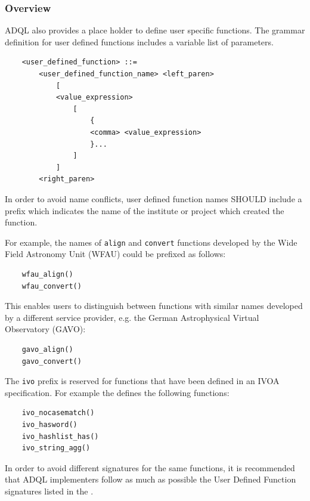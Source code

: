 \documentclass[11pt,a4paper]{ivoa}
\begin{document}
\subsubsection{Overview}

ADQL also provides a place holder to define user specific functions. The grammar
definition for user defined functions includes a variable list of parameters.

\begin{verbatim}
    <user_defined_function> ::=
        <user_defined_function_name> <left_paren>
            [
            <value_expression>
                [
                    {
                    <comma> <value_expression>
                    }...
                ]
            ]
        <right_paren>
\end{verbatim}

In order to avoid name conflicts, user defined function names SHOULD include
a prefix which indicates the name of the institute or project which created
the function.

For example, the names of \verb:align: and \verb:convert: functions developed
by the Wide Field Astronomy Unit (WFAU) could be prefixed as follows:
\begin{verbatim}
    wfau_align()
    wfau_convert()
\end{verbatim}

This enables users to distinguish between functions with similar names developed
by a different service provider, e.g. the German Astrophysical Virtual
Observatory (GAVO):
\begin{verbatim}
    gavo_align()
    gavo_convert()
\end{verbatim}

The \verb:ivo: prefix is reserved for functions that have been defined
in an IVOA specification. For example the \RegTAPSpec{} defines the following
functions:
\begin{verbatim}
    ivo_nocasematch()
    ivo_hasword()
    ivo_hashlist_has()
    ivo_string_agg()
\end{verbatim}

In order to avoid different signatures for the same functions, it is recommended
that ADQL implementers follow as much as possible the User Defined Function
signatures listed in the \CatalogueUDF{}.

\end{document}

